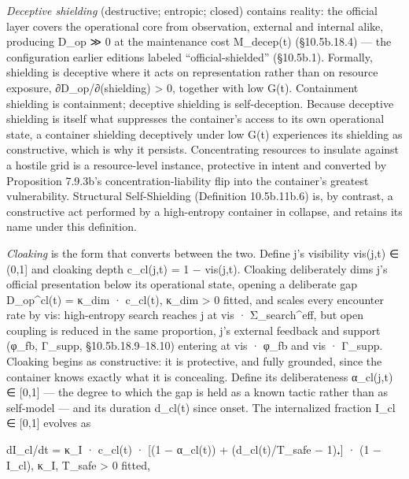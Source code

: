 \documentclass[
]{article}
\begin{document}
\emph{Deceptive shielding} (destructive; entropic; closed) contains
reality: the official layer covers the operational core from
observation, external and internal alike, producing D\_op ≫ 0 at the
maintenance cost M\_decep(t) (§10.5b.18.4) --- the configuration earlier
editions labeled ``official-shielded'' (§10.5b.1). Formally, shielding is
deceptive where it acts on representation rather than on resource
exposure, ∂D\_op/∂(shielding) \textgreater{} 0, together with low G(t).
Containment shielding is containment; deceptive shielding is
self-deception. Because deceptive shielding is itself what suppresses
the container's access to its own operational state, a container
shielding deceptively under low G(t) experiences its shielding as
constructive, which is why it persists. Concentrating resources to
insulate against a hostile grid is a resource-level instance, protective
in intent and converted by Proposition 7.9.3b's concentration-liability
flip into the container's greatest vulnerability. Structural
Self-Shielding (Definition 10.5b.11b.6) is, by contrast, a constructive
act performed by a high-entropy container in collapse, and retains its
name under this definition.

\emph{Cloaking} is the form that converts between the two. Define j's
visibility vis(j,t) ∈ (0,1{]} and cloaking depth c\_cl(j,t) = 1 −
vis(j,t). Cloaking deliberately dims j's official presentation below its
operational state, opening a deliberate gap D\_op\^{}cl(t) = κ\_dim ·
c\_cl(t), κ\_dim \textgreater{} 0 fitted, and scales every encounter rate
by vis: high-entropy search reaches j at vis · Σ\_search\^{}eff, but open
coupling is reduced in the same proportion, j's external feedback and
support (φ\_fb, Γ\_supp, §10.5b.18.9--18.10) entering at vis · φ\_fb and
vis · Γ\_supp. Cloaking begins as constructive: it is protective, and
fully grounded, since the container knows exactly what it is concealing.
Define its deliberateness α\_cl(j,t) ∈ {[}0,1{]} --- the degree to which the
gap is held as a known tactic rather than as self-model --- and its
duration d\_cl(t) since onset. The internalized fraction I\_cl ∈ {[}0,1{]}
evolves as

dI\_cl/dt = κ\_I · c\_cl(t) · {[}(1 − α\_cl(t)) + (d\_cl(t)/T\_safe −
1)₊{]} · (1 − I\_cl), κ\_I, T\_safe \textgreater{} 0 fitted,
\end{document}
